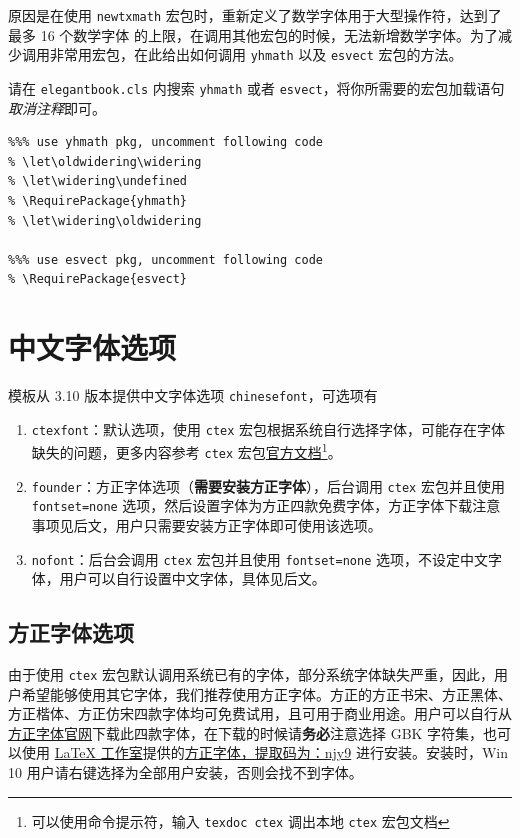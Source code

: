 \documentclass[lang=cn,newtx,10pt,scheme=chinese]{elegantbook}
\begin{document}
原因是在使用 \lstinline{newtxmath} 宏包时，重新定义了数学字体用于大型操作符，达到了 {\heiti 最多 16 个数学字体} 的上限，在调用其他宏包的时候，无法新增数学字体。为了减少调用非常用宏包，在此给出如何调用 \lstinline{yhmath} 以及 \lstinline{esvect} 宏包的方法。

请在 \lstinline{elegantbook.cls} 内搜索 \lstinline{yhmath} 或者 \lstinline{esvect}，将你所需要的宏包加载语句\textit{取消注释}即可。
\begin{lstlisting}
%%% use yhmath pkg, uncomment following code
% \let\oldwidering\widering
% \let\widering\undefined
% \RequirePackage{yhmath}
% \let\widering\oldwidering

%%% use esvect pkg, uncomment following code
% \RequirePackage{esvect}
\end{lstlisting}

\section{中文字体选项}
模板从 3.10 版本提供中文字体选项 \lstinline{chinesefont}，可选项有
\begin{enumerate}
\item \lstinline{ctexfont}：默认选项，使用 \lstinline{ctex} 宏包根据系统自行选择字体，可能存在字体缺失的问题，更多内容参考 \lstinline{ctex} 宏包\href{https://ctan.org/pkg/ctex}{官方文档}\footnote{可以使用命令提示符，输入 \lstinline{texdoc ctex} 调出本地 \lstinline{ctex} 宏包文档}。
\item \lstinline{founder}：方正字体选项（\textbf{需要安装方正字体}），后台调用 \lstinline{ctex} 宏包并且使用 \lstinline{fontset=none} 选项，然后设置字体为方正四款免费字体，方正字体下载注意事项见后文，用户只需要安装方正字体即可使用该选项。
\item \lstinline{nofont}：后台会调用 \lstinline{ctex} 宏包并且使用 \lstinline{fontset=none} 选项，不设定中文字体，用户可以自行设置中文字体，具体见后文。
\end{enumerate}

\subsection{方正字体选项}
由于使用 \lstinline{ctex} 宏包默认调用系统已有的字体，部分系统字体缺失严重，因此，用户希望能够使用其它字体，我们推荐使用方正字体。方正的{\songti 方正书宋}、{\heiti 方正黑体}、{\kaishu 方正楷体}、{\fangsong 方正仿宋}四款字体均可免费试用，且可用于商业用途。用户可以自行从\href{http://www.foundertype.com/}{方正字体官网}下载此四款字体，在下载的时候请\textbf{务必}注意选择 GBK 字符集，也可以使用 \href{https://www.latexstudio.net/}{\LaTeX{} 工作室}提供的\href{https://pan.baidu.com/s/1BgbQM7LoinY7m8yeP25Y7Q}{方正字体，提取码为：njy9} 进行安装。安装时，{\kaishu Win 10 用户请右键选择为全部用户安装，否则会找不到字体。}
\end{document}
